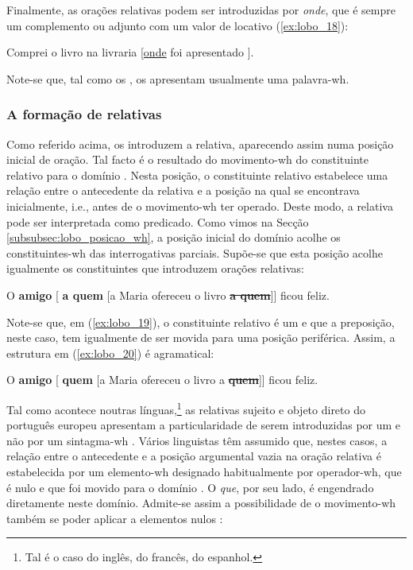 \documentclass[output=paper]{LSP/langsci}
\begin{document}
Finalmente, as orações relativas podem ser introduzidas por \textit{onde}, que é sempre um complemento ou adjunto com um valor de locativo (\ref{ex:lobo_18}):

\ea\label{ex:lobo_18} Comprei o livro na livraria [\underline{onde} foi apresentado \underline{\hspace{1em}}].
\z

Note-se que, tal como os , os  apresentam usualmente uma palavra-wh.



\subsubsection{A formação de relativas}
\label{subsubsec:lobo_formacao_rel}

Como referido acima, os  introduzem a relativa, aparecendo assim numa posição inicial de oração. Tal facto é o resultado do movimento-wh do constituinte relativo para o domínio . Nesta posição, o constituinte relativo estabelece uma relação entre o antecedente da relativa e a posição na qual se encontrava inicialmente, i.e., antes de o movimento-wh ter operado. Deste modo, a relativa pode ser interpretada como predicado. Como vimos na Secção \ref{subsubsec:lobo_posicao_wh}, a posição inicial do domínio  acolhe os constituintes-wh das interrogativas parciais. Supõe-se que esta posição acolhe igualmente os constituintes que introduzem orações relativas:

\ea\label{ex:lobo_19} O \textbf{amigo} [\textsubscript{} \textbf{a quem} [a Maria ofereceu o livro \sout{\textbf{a quem}}]] ficou feliz.\z

Note-se que, em (\ref{ex:lobo_19}), o constituinte relativo é um  e que a preposição, neste caso, tem igualmente de ser movida para uma posição periférica. Assim, a estrutura em (\ref{ex:lobo_20}) é agramatical:

\ea\label{ex:lobo_20} O \textbf{amigo} [\textsubscript{} \textbf{quem} [a Maria ofereceu o livro a \sout{\textbf{quem}}]] ficou feliz.\z

Tal como acontece noutras línguas,\footnote{Tal é o caso do inglês, do francês, do espanhol.} as relativas sujeito e objeto direto do português europeu apresentam a particularidade de serem introduzidas por um  e não por um sintagma-wh \citep{brito1991}. Vários linguistas têm assumido que, nestes casos, a relação entre o antecedente e a posição argumental vazia na oração relativa é estabelecida por um elemento-wh designado habitualmente por operador-wh, que é nulo e que foi movido para o domínio . O  \textit{que}, por seu lado, é engendrado diretamente neste domínio. Admite-se assim a possibilidade de o movimento-wh também se poder aplicar a elementos nulos \citep{chomsky1977}:
\end{document}
